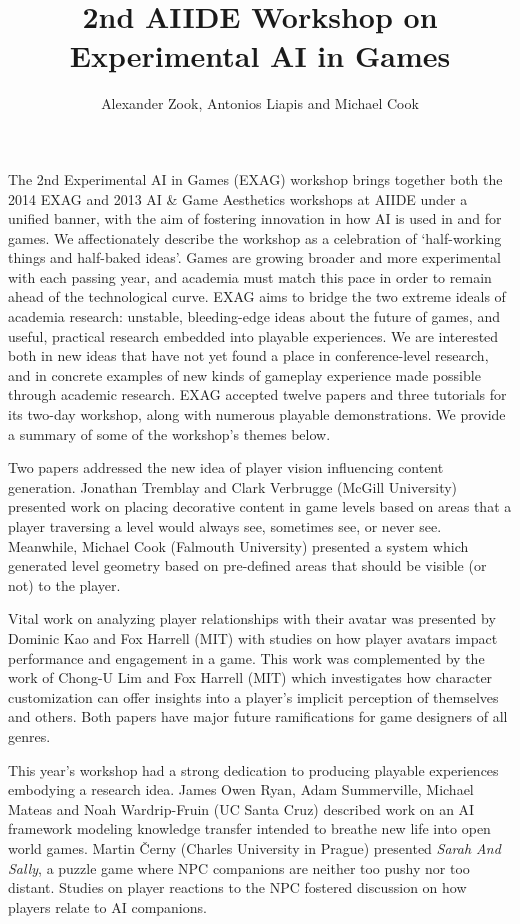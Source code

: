 \documentclass[10pt,letterpaper]{article}
\author{Alexander Zook, Antonios Liapis and Michael Cook}
\title{2nd AIIDE Workshop on Experimental AI in Games}
\date{}
\begin{document}
\maketitle
The 2nd Experimental AI in Games (EXAG) workshop brings together both the 2014 EXAG and 2013 AI \& Game Aesthetics workshops at AIIDE under a unified banner, with the aim of fostering innovation in how AI is used in and for games.
We affectionately describe the workshop as a celebration of `half-working things and half-baked ideas'.
Games are growing broader and more experimental with each passing year, and academia must match this pace in order to remain ahead of the technological curve.
EXAG aims to bridge the two extreme ideals of academia research: unstable, bleeding-edge ideas about the future of games, and useful, practical research embedded into playable experiences.
We are interested both in new ideas that have not yet found a place in conference-level research, and in concrete examples of new kinds of gameplay experience made possible through academic research.
EXAG accepted twelve papers and three tutorials for its two-day workshop, along with numerous playable demonstrations.
We provide a summary of some of the workshop's themes below.

Two papers addressed the new idea of player vision influencing content generation.
Jonathan Tremblay and Clark Verbrugge (McGill University) presented work on placing decorative content in game levels based on areas that a player traversing a level would always see, sometimes see, or never see.
Meanwhile, Michael Cook (Falmouth University) presented a system which generated level geometry based on pre-defined areas that should be visible (or not) to the player.

Vital work on analyzing player relationships with their avatar was presented by Dominic Kao and Fox Harrell (MIT) with studies on how player avatars impact performance and engagement in a game.
This work was complemented by the work of Chong-U Lim and Fox Harrell (MIT) which investigates how character customization can offer insights into a player's implicit perception of themselves and others.
Both papers have major future ramifications for game designers of all genres.

This year's workshop had a strong dedication to producing playable experiences embodying a research idea.
James Owen Ryan, Adam Summerville, Michael Mateas and Noah Wardrip-Fruin (UC Santa Cruz) described work on an AI framework modeling knowledge transfer intended to breathe new life into open world games.
Martin \v{C}erny (Charles University in Prague) presented \emph{Sarah And Sally}, a puzzle game where NPC companions are neither too pushy nor too distant.
Studies on player reactions to the NPC fostered discussion on how players relate to AI companions.
\end{document}
